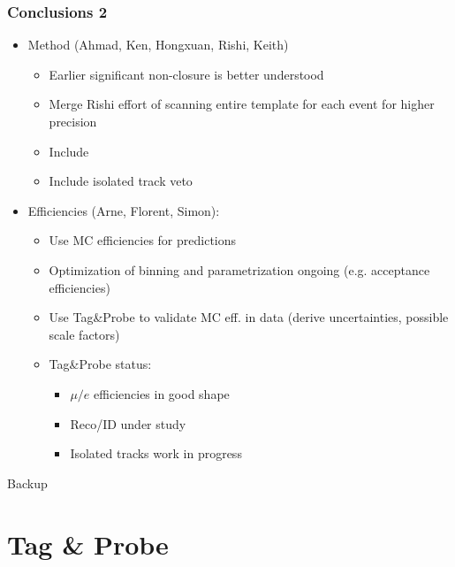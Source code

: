\documentclass{beamer}
\begin{document}
\begin{frame}
 \frametitle{Conclusions 2}
 \begin{itemize}
  \item \hadtau Method (Ahmad, Ken, Hongxuan, Rishi, Keith)
  \begin{itemize}
   \item Earlier significant non-closure is better understood
   \item Merge Rishi effort of scanning entire template for each event for higher precision
   \item Include \wpj
   \item Include isolated track veto
  \end{itemize}
  \item Efficiencies (Arne, Florent, Simon):
  \begin{itemize}
   \item Use MC efficiencies for predictions
   \item Optimization of binning and parametrization ongoing (e.g. acceptance efficiencies)
   \item Use Tag\&Probe to validate MC eff. in data (derive uncertainties, possible scale factors)
   \item Tag\&Probe status:
   \begin{itemize}
    \item $\mu/e$ efficiencies in good shape
    \item Reco/ID under study
    \item Isolated tracks work in progress
   \end{itemize}

  \end{itemize}


 \end{itemize}

\end{frame}




\begin{frame}
 \begin{block}{}
 \centering
 \Large Backup
 \end{block}
\end{frame}

\section{Tag \& Probe}
\end{document}

